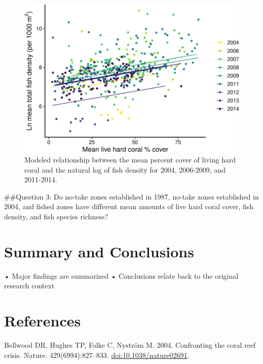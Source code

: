 \documentclass[12pt,]{article}
\begin{document}
\begin{figure}

\includegraphics{Mullaney_ENV872_Project_files/figure-latex/Fish Density Plot-1} \hfill{}

\caption{Modeled relationship between the mean percent cover of living hard coral and the natural log of fish density for 2004, 2006-2009, and 2011-2014.}\label{fig:Fish Density Plot}
\end{figure}

\#\#Question 3: Do no-take zones established in 1987, no-take zones
established in 2004, and fished zones have different mean amounts of
live hard coral cover, fish density, and fish species richness?

\newpage

\hypertarget{summary-and-conclusions}{%
\section{Summary and Conclusions}\label{summary-and-conclusions}}

• Major findings are summarized • Conclusions relate back to the
original research context

\newpage

\hypertarget{references}{%
\section{References}\label{references}}

Bellwood DR, Hughes TP, Folke C, Nyström M. 2004. Confronting the coral
reef crisis. Nature. 429(6994):827--833. \url{doi:10.1038/nature02691}.
\end{document}
